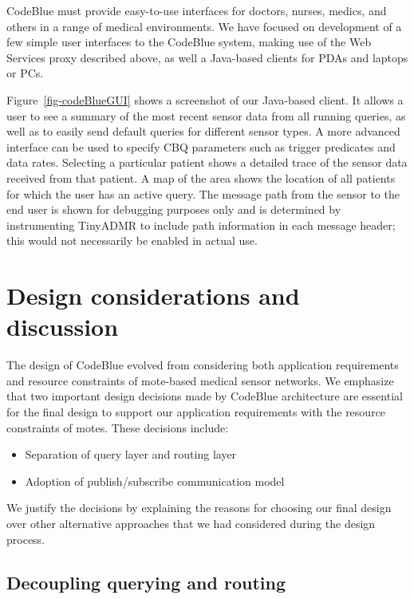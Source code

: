 CodeBlue must provide easy-to-use interfaces for doctors, nurses,
medics, and others in a range of medical environments.  We
have focused on development of a few simple user interfaces to the
CodeBlue system, making use of the Web Services proxy described above,
as well a Java-based clients for PDAs and laptops or PCs.  

Figure~\ref{fig-codeBlueGUI} shows a screenshot of our 
Java-based client.  It allows a user to see a summary of the most
recent sensor data from all running queries, as well as to easily send
default queries for different sensor types.  A more advanced interface
can be used to specify CBQ parameters such as trigger predicates and
data rates. Selecting a particular patient shows a detailed trace of
the sensor data received from that patient.  A map of the area shows
the location of all patients for which the user has an active
query. The message path from the sensor to the end user is shown for
debugging purposes only and is determined by instrumenting TinyADMR to
include path information in each message header; this would not
necessarily be enabled in actual use.


\section{Design considerations and discussion}

The design of CodeBlue evolved from considering both application requirements
and resource constraints of mote-based medical sensor networks. We emphasize
that two important design decisions made by CodeBlue architecture are
essential for the final design to support our application requirements with
the resource constraints of motes. These decisions include:

\begin{itemize}
\item{Separation of query layer and routing layer} 
\item{Adoption of publish/subscribe communication model} 
\end{itemize}

We justify the decisions by explaining the reasons for choosing our final
design over other alternative approaches that we had considered during
the design process.

\subsection {Decoupling querying and routing}


